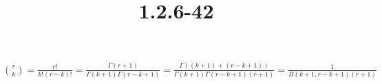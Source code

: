 \documentclass{article}
\title{1.2.6-42}
\begin{document}
\maketitle

\( \binom{r}{k} = \frac{r!}{k!(r-k)!} = \frac{\Gamma(r+1)}{\Gamma(k+1)\Gamma(r-k + 1)} = \frac{\Gamma((k+1) + (r-k+1))}{\Gamma(k+1)\Gamma(r-k + 1)(r+1)} = \frac{1}{B(k+1, r-k+1) (r+1)} \)
\end{document}
